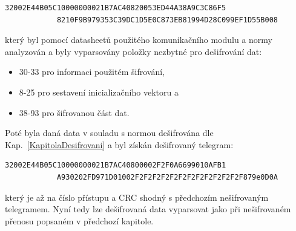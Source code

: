 \begin{lstlisting}[style=MyCodePHP]
			32002E44B05C10000000021B7AC40820053ED44A38A9C3C86F5
			8210F9B979353C39DC1D5E0C873EB81994D28C099EF1D55B008
\end{lstlisting}

který byl pomocí datasheetů použitého komunikačního modulu \cite{ModulIQRF} a normy~\cite{Norma1,NormaFIPS} analyzován a byly vyparsovány položky nezbytné pro dešifrování dat:
\begin{itemize}
	\item 30-33 pro informaci použitém šifrování,
	\item 8-25 pro sestavení inicializačního vektoru a
	\item 38-93 pro šifrovanou část dat.
\end{itemize}

\newpage

Poté byla daná data v souladu s normou \cite{NormaFIPS} dešifrována dle Kap.~\ref{KapitolaDesifrovani} a byl získán dešifrovaný telegram:



\begin{lstlisting}[style=MyCodePHP]
			32002E44B05C10000000021B7AC40800002F2F0A6699010AFB1
			A930202FD971D01002F2F2F2F2F2F2F2F2F2F2F2F2F879e0D0A
\end{lstlisting}

který je až na číslo přístupu a CRC shodný s předchozím nešifrovaným telegramem. Nyní tedy lze dešifrovaná data vyparsovat jako při nešifrovaném přenosu popsaném v předchozí kapitole.

